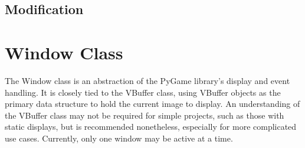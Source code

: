 \documentclass[letterpaper,10pt,english,openany,oneside]{sphinxmanual}
\begin{document}
\section{Modification}
\label{\detokenize{fundamentals:modification}}
\def\sphinxLiteralBlockLabel{\label{\detokenize{fundamentals:id8}}}
\begin{sphinxVerbatim}[commandchars=\\\{\}]
  
\PYG{p}{[}\PYG{p}{]}  
\end{sphinxVerbatim}
\def\sphinxLiteralBlockLabel{\label{\detokenize{fundamentals:id9}}}
\begin{sphinxVerbatim}[commandchars=\\\{\}]
  
\PYG{p}{[}\PYG{p}{]}  
\end{sphinxVerbatim}
\def\sphinxLiteralBlockLabel{\label{\detokenize{fundamentals:id10}}}
\begin{sphinxVerbatim}[commandchars=\\\{\}]
  
\end{sphinxVerbatim}
\def\sphinxLiteralBlockLabel{\label{\detokenize{fundamentals:id11}}}
\begin{sphinxVerbatim}[commandchars=\\\{\}]
\end{sphinxVerbatim}


\chapter{Window Class}
\label{\detokenize{fundamentals:window-class}}
\sphinxAtStartPar
The Window class is an abstraction of the PyGame library’s display and event handling. It is closely tied to the VBuffer class, using VBuffer objects as the primary data structure to hold the current image to display. An understanding of the VBuffer class may not be required for simple projects, such as those with static displays, but is recommended nonetheless, especially for more complicated use cases. Currently, only one window may be active at a time.
\end{document}
